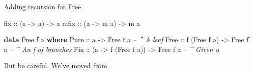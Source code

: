\documentclass[ignorenonframetext]{beamer}
\newenvironment{Shaded}{}{}
\newcommand{\CommentTok}[1]{\textcolor[rgb]{0.38,0.63,0.69}{\textit{#1}}}
\newcommand{\DataTypeTok}[1]{\textcolor[rgb]{0.56,0.13,0.00}{#1}}
\newcommand{\KeywordTok}[1]{\textcolor[rgb]{0.00,0.44,0.13}{\textbf{#1}}}
\newcommand{\NormalTok}[1]{#1}
\newcommand{\OtherTok}[1]{\textcolor[rgb]{0.00,0.44,0.13}{#1}}
\begin{document}

\begin{frame}[fragile]{%
\protect\hypertarget{adding-recursion-for-free}{%
Adding recursion for Free}}

\begin{Shaded}
\begin{Highlighting}[]
\OtherTok{fix ::}\NormalTok{ (a }\OtherTok{->}\NormalTok{ a) }\OtherTok{->}\NormalTok{ a}
\OtherTok{mfix ::}\NormalTok{ (a }\OtherTok{->}\NormalTok{ m a) }\OtherTok{->}\NormalTok{ m a}
\end{Highlighting}
\end{Shaded}

\begin{Shaded}
\begin{Highlighting}[]
\KeywordTok{data} \DataTypeTok{Free}\NormalTok{ f a }\KeywordTok{where}
  \DataTypeTok{Pure}\OtherTok{ ::}\NormalTok{  a                  }\OtherTok{->} \DataTypeTok{Free}\NormalTok{ f a  }\CommentTok{-- ^ A leaf}
  \DataTypeTok{Free}\OtherTok{ ::}\NormalTok{       f (}\DataTypeTok{Free}\NormalTok{ f a)  }\OtherTok{->} \DataTypeTok{Free}\NormalTok{ f a  }\CommentTok{-- ^ An f of branches}
  \DataTypeTok{Fix}\OtherTok{  ::}\NormalTok{ (a }\OtherTok{->}\NormalTok{ f (}\DataTypeTok{Free}\NormalTok{ f a)) }\OtherTok{->} \DataTypeTok{Free}\NormalTok{ f a  }\CommentTok{-- ^ Given a }
\end{Highlighting}
\end{Shaded}

But be careful. We’ve moved from

\end{frame}
\end{document}

